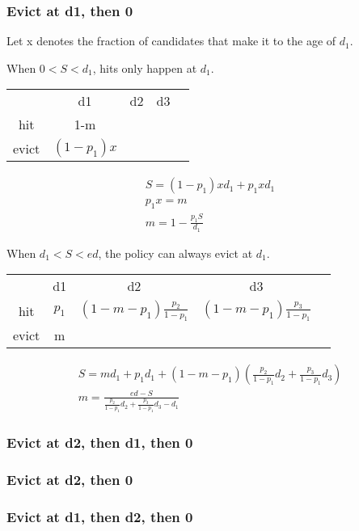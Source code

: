 \documentclass[12pt, letterpaper]{article}
\begin{document}
\subsubsection{Evict at d1, then 0}

Let x denotes the fraction of candidates that make it to the age of $d_1$.

When $0<S<d_1$, hits only happen at $d_1$. 
\begin{center}
\begin{tabular}{ c c c c c }
 		& d1  & d2 & d3\\ 
 hit 	& 1-m & &\\  
 evict 	& $(1-p_1)x$   & &
\end{tabular}
\end{center}

\begin{equation}
\begin{gathered}
S = (1-p_1)xd_1 + p_1 x d_1 \\
p_1 x = m \\
m = 1 - \frac{p_1 S}{d_1}
\end{gathered}
\end{equation}

When $d_1<S<ed$, the policy can always evict at $d_1$. 
\begin{center}
\begin{tabular}{ c c c c c }
 		& d1    & d2 & d3\\ 
 hit 	& $p_1$ & $(1-m-p_1)\frac{p_2}{1-p_1}$  &$(1-m-p_1)\frac{p_3}{1-p_1}$\\
 evict 	& m   & &
\end{tabular}
\end{center}

\begin{equation}
\begin{gathered}
S = m d_1 + p_1 d_1 + (1-m-p_1)(\frac{p_2}{1-p_1} d_2 + \frac{p_3}{1-p_1} d_3)\\
m = \frac{ed-S}{\frac{p_2}{1-p_1}d_2+\frac{p_3}{1-p_1}d_3-d_1}
\end{gathered}
\end{equation}

\subsubsection{Evict at d2, then d1, then 0}
\subsubsection{Evict at d2, then 0}
\subsubsection{Evict at d1, then d2, then 0}
\end{document}
